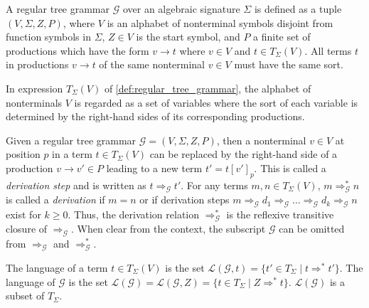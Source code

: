 \documentclass[
    a4paper,
    12pt,
    twoside,
    BCOR=12mm,
    parskip=half,
    chapterprefix,
    numbers=noenddot,
    bibliography=totoc
]{scrbook}
\begin{document}
\begin{definition} 
	\label{def:regular_tree_grammar}
	A regular tree grammar $\mathcal{G}$ over an algebraic signature $\Sigma$ is defined as a tuple $(V,\Sigma,Z,P)$, where $V$ is an alphabet of nonterminal symbols disjoint from function symbols in $\Sigma$, $Z \in V$ is the start symbol, and $P$ a finite set of productions which have the form $v \to t$ where $v \in V$ and $t \in T_\Sigma(V)$. All terms $t$ in productions $v \to t$ of the same nonterminal $v \in V$ must have the same sort.
\end{definition}

\begin{remark}
	In expression $T_\Sigma(V)$ of \cref{def:regular_tree_grammar}, the alphabet of nonterminals $V$ is regarded as a set of variables where the sort of each variable is determined by the right-hand sides of its corresponding productions.
\end{remark}

Given a regular tree grammar $\mathcal{G}=(V,\Sigma,Z,P)$, then a nonterminal $v \in V$ at position $p$ in a term $t \in T_\Sigma(V)$ can be replaced by the right-hand side of a production $v \to v' \in P$ leading to a new term $t'=t[v']_p$. This is called a \emph{derivation step} and is written as $t \Rightarrow_\mathcal{G} t'$. For any terms $m,n \in T_\Sigma(V)$, $m \Rightarrow^*_\mathcal{G} n$ is called a \emph{derivation} if $m=n$ or if derivation steps $m \Rightarrow_\mathcal{G} d_1 \Rightarrow_\mathcal{G} \ldots \Rightarrow_\mathcal{G} d_k \Rightarrow_\mathcal{G} n$ exist for $k \geq 0$. Thus, the derivation relation $\Rightarrow^*_\mathcal{G}$ is the reflexive transitive closure of $\Rightarrow_\mathcal{G}$. When clear from the context, the subscript $\mathcal{G}$ can be omitted from $\Rightarrow_\mathcal{G}$ and $\Rightarrow^*_\mathcal{G}$.

The language of a term $t \in T_\Sigma(V)$ is the set $\mathcal{L}(\mathcal{G},t) = \{ t' \in T_\Sigma \mid t \Rightarrow^* t' \}$. The language of $\mathcal{G}$ is the set $\mathcal{L}(\mathcal{G}) = \mathcal{L}(\mathcal{G},Z) = \{ t \in T_\Sigma \mid Z \Rightarrow^* t \}$. $\mathcal{L}(\mathcal{G})$ is a subset of $T_\Sigma$.
\end{document}
